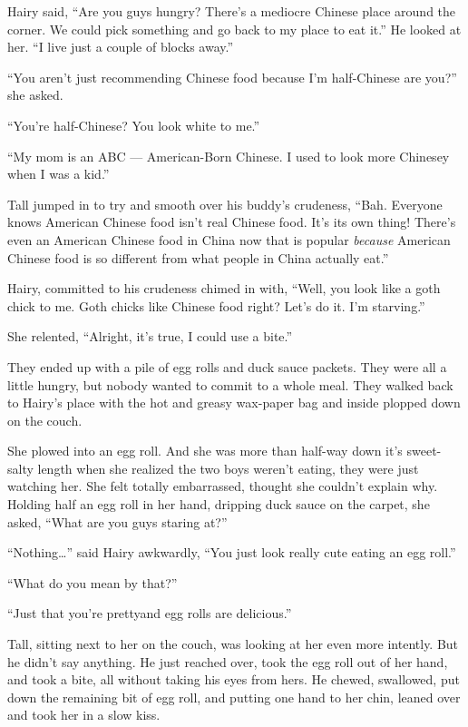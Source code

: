 \documentclass[letterpaper]{article}
\begin{document}
\begin{multicols}{2}
Hairy said, ``Are you guys hungry? There's a mediocre Chinese place around the corner. We could pick something and go back to my place to eat it.'' He looked at her.
``I live just a couple of blocks away.''

``You aren't just recommending Chinese food because I'm half-Chinese are you?'' she asked.

``You're half-Chinese? You look white to me.''

``My mom is an ABC --- American-Born Chinese. I used to look more Chinesey when I was a kid.''

Tall jumped in to try and smooth over his buddy's crudeness, ``Bah. Everyone knows American Chinese food isn't real Chinese food. It's its own thing! There's even an American Chinese food in China now that is popular \emph{because} American Chinese food is so different from what people in China actually eat.''

Hairy, committed to his crudeness chimed in with, ``Well, you look like a goth chick to me. Goth chicks like Chinese food right? Let's do it. I'm starving.''

She relented, ``Alright, it's true, I could use a bite.''

They ended up with a pile of egg rolls and duck sauce packets.
They were all a little hungry, but nobody wanted to commit to a whole meal.
They walked back to Hairy's place with the hot and greasy wax-paper bag and inside plopped down on the couch.

She plowed into an egg roll.
And she was more than half-way down it's sweet-salty length when she realized the two boys weren't eating, they were just watching her.
She felt totally embarrassed, thought she couldn't explain why.
Holding half an egg roll in her hand, dripping duck sauce on the carpet, she asked, ``What are you guys staring at?''

``Nothing\ldots'' said Hairy awkwardly, ``You just look really cute eating an egg roll.''

``What do you mean by that?''

``Just that you're pretty\lots and egg rolls are delicious.''

Tall, sitting next to her on the couch, was looking at her even more intently.
But he didn't say anything. He just reached over, took the egg roll out of her hand, and took a bite, all without taking his eyes from hers.
He chewed, swallowed, put down the remaining bit of egg roll, and putting one hand to her chin, leaned over and took her in a slow kiss.


\end{multicols}
\end{document}

